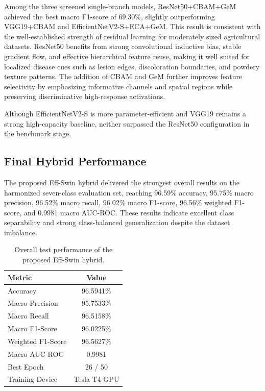 \documentclass[conference]{IEEEtran}
\begin{document}
Among the three screened single-branch models, ResNet50+CBAM+GeM achieved the best macro F1-score of 69.30\%, slightly outperforming VGG19+CBAM and EfficientNetV2-S+ECA+GeM. This result is consistent with the well-established strength of residual learning for moderately sized agricultural datasets. ResNet50 benefits from strong convolutional inductive bias, stable gradient flow, and effective hierarchical feature reuse, making it well suited for localized disease cues such as lesion edges, discoloration boundaries, and powdery texture patterns. The addition of CBAM and GeM further improves feature selectivity by emphasizing informative channels and spatial regions while preserving discriminative high-response activations.

Although EfficientNetV2-S is more parameter-efficient and VGG19 remains a strong high-capacity baseline, neither surpassed the ResNet50 configuration in the benchmark stage.

\subsection{Final Hybrid Performance}
The proposed Eff-Swin hybrid delivered the strongest overall results on the harmonized seven-class evaluation set, reaching 96.59\% accuracy, 95.75\% macro precision, 96.52\% macro recall, 96.02\% macro F1-score, 96.56\% weighted F1-score, and 0.9981 macro AUC-ROC. These results indicate excellent class separability and strong class-balanced generalization despite the dataset imbalance.

\begin{table}[htbp]
\caption{Overall test performance of the proposed Eff-Swin hybrid.}
\label{tab:hybrid_results}
\centering
\begin{tabular}{lc}
\toprule
\textbf{Metric} & \textbf{Value} \\
\midrule
Accuracy & 96.5941\% \\
Macro Precision & 95.7533\% \\
Macro Recall & 96.5158\% \\
Macro F1-Score & 96.0225\% \\
Weighted F1-Score & 96.5627\% \\
Macro AUC-ROC & 0.9981 \\
\midrule
Best Epoch & 26 / 50 \\
Training Device & Tesla T4 GPU \\
\bottomrule
\end{tabular}
\end{table}
\end{document}

